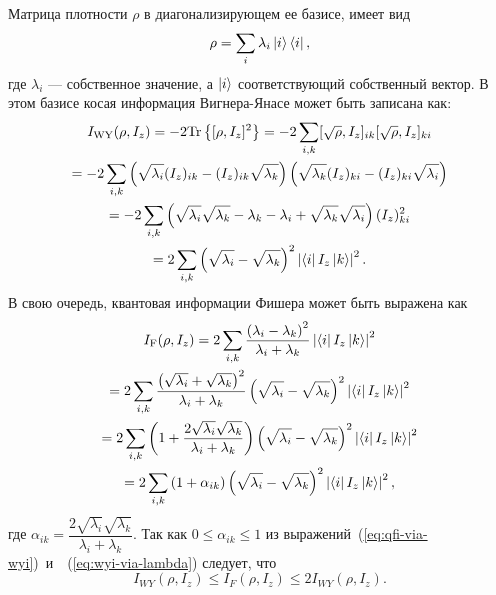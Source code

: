 Матрица плотности $\rho$ в диагонализирующем ее базисе,
имеет вид
%
\begin{equation}
  \rho = \sum\limits_i \lambda_i \left| i \right\rangle\left\langle i \right|,
\end{equation}
%
где $\lambda_i$ --- собственное значение,
а $\left| i \right\rangle$ соответствующий собственный вектор.
%
В этом базисе косая информация Вигнера-Янасе может быть записана как:
%
\begin{multline}\label{eq:wyi-via-lambda}
  I_\mathrm{WY}(\rho, I_z)
  = -2 \mathrm{Tr} \left\{ [\rho, I_z]^2 \right\}
  = -2 \sum\limits_{i,k} [\sqrt{\rho}, I_z]_{ik} [\sqrt{\rho}, I_z]_{ki}
  \\
  = -2 \sum\limits_{i,k}
    \left( \sqrt{\lambda_i}(I_z)_{ik} - (I_z)_{ik} \sqrt{\lambda_k} \right)
    \left( \sqrt{\lambda_k}(I_z)_{ki} - (I_z)_{ki} \sqrt{\lambda_i} \right)
  \\
  = -2 \sum\limits_{i,k} \left( 
    \sqrt{\lambda_i}\sqrt{\lambda_k}
    - \lambda_k
    - \lambda_i
    + \sqrt{\lambda_k}\sqrt{\lambda_i}
     \right)
    (I_z)^2_{ki}
  \\
  = 2 \sum\limits_{i,k} \left( \sqrt{\lambda_i} -\sqrt{\lambda_k} \right)^2
    \left| \left\langle i \right| I_z \left| k \right\rangle \right|^2.
\end{multline}
%
В свою очередь, квантовая информации Фишера может быть выражена как
%
\begin{multline}\label{eq:qfi-via-wyi}
  I_\mathrm{F}(\rho, I_z)
  = 2 \sum\limits_{i,k}
    \dfrac{\left( \lambda_i - \lambda_k \right)^2}{\lambda_i + \lambda_k}
    \left| \left\langle i \right| I_z \left| k \right\rangle \right|^2
  \\
  = 2 \sum\limits_{i,k}
    \dfrac{
      \left( \sqrt{\lambda_i} +\sqrt{\lambda_k} \right)^2
    }{
      \lambda_i + \lambda_k
    }
    \left( \sqrt{\lambda_i} -\sqrt{\lambda_k} \right)^2
    \left| \left\langle i \right| I_z \left| k \right\rangle \right|^2
  \\
  = 2 \sum\limits_{i,k}
    \left( 1 + \dfrac{2\sqrt{\lambda_i}\sqrt{\lambda_k}}{\lambda_i + \lambda_k} \right)
    \left( \sqrt{\lambda_i} -\sqrt{\lambda_k} \right)^2
    \left| \left\langle i \right| I_z \left| k \right\rangle \right|^2
  \\
  = 2 \sum\limits_{i,k} \left( 1 + \alpha_{ik} \right)
  \left( \sqrt{\lambda_i} -\sqrt{\lambda_k} \right)^2
  \left| \left\langle i \right| I_z \left| k \right\rangle \right|^2,
\end{multline}
%
где $\alpha_{ik} = \dfrac{2\sqrt{\lambda_i}\sqrt{\lambda_k}}{\lambda_i + \lambda_k}$.
Так как $ 0 \leq \alpha_{ik} \leq 1$
из выражений~(\ref{eq:qfi-via-wyi})~и~~(\ref{eq:wyi-via-lambda}) следует, что
%
\begin{equation} \label{eq:qfi-wyi-inequality}
    I_{WY}\left(\rho, I_z\right)
    \leq I_F\left(\rho, I_z\right)
    \leq 2I_{WY}\left(\rho, I_z\right).
\end{equation}

